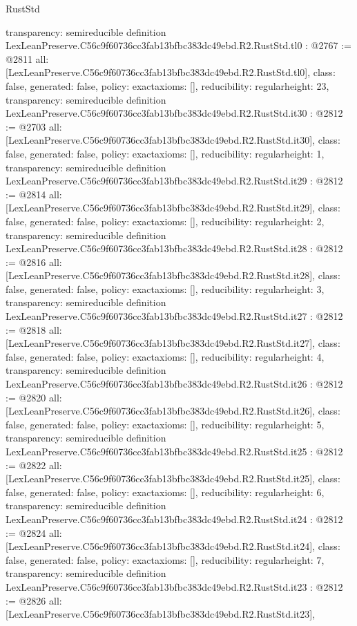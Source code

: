 \begin{lexlean}{RustStd}
\begin{coremodule}
{  transparency: semireducible
}
definition LexLeanPreserve.C56c9f60736cc3fab13bfbc383dc49ebd.R2.RustStd.tl0 : @2767 := @2811 {
  all: [LexLeanPreserve.C56c9f60736cc3fab13bfbc383dc49ebd.R2.RustStd.tl0],
  class: false,
  generated: false,
  policy: exact{axioms: []},
  reducibility: regular{height: 23},
  transparency: semireducible
}
definition LexLeanPreserve.C56c9f60736cc3fab13bfbc383dc49ebd.R2.RustStd.it30 : @2812 := @2703 {
  all: [LexLeanPreserve.C56c9f60736cc3fab13bfbc383dc49ebd.R2.RustStd.it30],
  class: false,
  generated: false,
  policy: exact{axioms: []},
  reducibility: regular{height: 1},
  transparency: semireducible
}
definition LexLeanPreserve.C56c9f60736cc3fab13bfbc383dc49ebd.R2.RustStd.it29 : @2812 := @2814 {
  all: [LexLeanPreserve.C56c9f60736cc3fab13bfbc383dc49ebd.R2.RustStd.it29],
  class: false,
  generated: false,
  policy: exact{axioms: []},
  reducibility: regular{height: 2},
  transparency: semireducible
}
definition LexLeanPreserve.C56c9f60736cc3fab13bfbc383dc49ebd.R2.RustStd.it28 : @2812 := @2816 {
  all: [LexLeanPreserve.C56c9f60736cc3fab13bfbc383dc49ebd.R2.RustStd.it28],
  class: false,
  generated: false,
  policy: exact{axioms: []},
  reducibility: regular{height: 3},
  transparency: semireducible
}
definition LexLeanPreserve.C56c9f60736cc3fab13bfbc383dc49ebd.R2.RustStd.it27 : @2812 := @2818 {
  all: [LexLeanPreserve.C56c9f60736cc3fab13bfbc383dc49ebd.R2.RustStd.it27],
  class: false,
  generated: false,
  policy: exact{axioms: []},
  reducibility: regular{height: 4},
  transparency: semireducible
}
definition LexLeanPreserve.C56c9f60736cc3fab13bfbc383dc49ebd.R2.RustStd.it26 : @2812 := @2820 {
  all: [LexLeanPreserve.C56c9f60736cc3fab13bfbc383dc49ebd.R2.RustStd.it26],
  class: false,
  generated: false,
  policy: exact{axioms: []},
  reducibility: regular{height: 5},
  transparency: semireducible
}
definition LexLeanPreserve.C56c9f60736cc3fab13bfbc383dc49ebd.R2.RustStd.it25 : @2812 := @2822 {
  all: [LexLeanPreserve.C56c9f60736cc3fab13bfbc383dc49ebd.R2.RustStd.it25],
  class: false,
  generated: false,
  policy: exact{axioms: []},
  reducibility: regular{height: 6},
  transparency: semireducible
}
definition LexLeanPreserve.C56c9f60736cc3fab13bfbc383dc49ebd.R2.RustStd.it24 : @2812 := @2824 {
  all: [LexLeanPreserve.C56c9f60736cc3fab13bfbc383dc49ebd.R2.RustStd.it24],
  class: false,
  generated: false,
  policy: exact{axioms: []},
  reducibility: regular{height: 7},
  transparency: semireducible
}
definition LexLeanPreserve.C56c9f60736cc3fab13bfbc383dc49ebd.R2.RustStd.it23 : @2812 := @2826 {
  all: [LexLeanPreserve.C56c9f60736cc3fab13bfbc383dc49ebd.R2.RustStd.it23],
}
\end{coremodule}
\end{lexlean}
